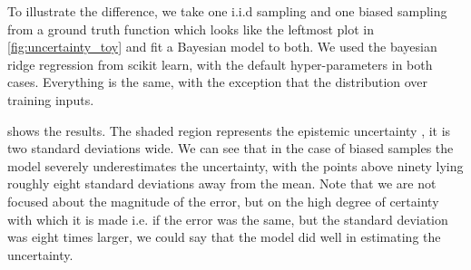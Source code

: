 


To illustrate the difference, we take one i.i.d sampling and one biased sampling from a ground truth function which looks like the leftmost plot in \cref{fig:uncertainty_toy} and fit a Bayesian model to both. We used the bayesian ridge regression from scikit learn\citep{scikit-learn}, with the default hyper-parameters in both cases. Everything is the same, with the exception that the distribution over training inputs.

 shows the results. The shaded region represents the epistemic uncertainty 
, it is two standard deviations wide. We can see that in the case of biased samples the model severely underestimates the uncertainty, with the points above ninety lying roughly eight standard deviations away from the mean. Note that we are not focused about the magnitude of the error, but on the high degree of certainty with which it is made i.e. if the error was the same, but the standard deviation was eight times larger, we could say that the model did well in estimating the uncertainty. 

